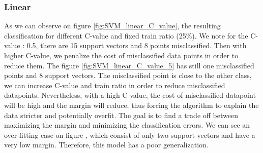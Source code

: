 \subsubsection{Linear}
As we can observe on figure \ref{fig:SVM_linear_C_value}, the resulting classification for different C-value and fixed train ratio (25\%). We note for the C-value : 0.5, there are 15 support vectors and 8 points misclassified. Then with higher C-value, we penalize the cost of misclassified data points in order to reduce them. The figure \ref{fig:SVM_linear_C_value_5} has still one misclassified points and 8 support vectors. The misclassified point is close to the other class, we can increase C-value and train ratio in order to reduce misclassified datapoints. Nevertheless, with a high C-value, the cost of misclassified datapoint will be high and the margin will reduce, thus forcing the algorithm to explain the data stricter and potentially overfit. The goal is to find a trade off between maximizing the margin and minimizing the classification errors. We can see an over-fitting case on figure %
, which consist of only two support vectors and have a very low margin. Therefore, this model has a poor generalization.


